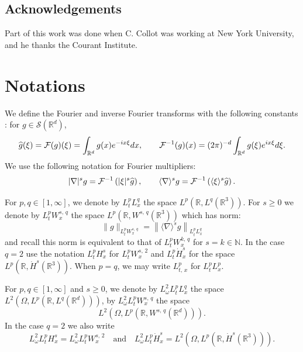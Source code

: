 \documentclass[AHL, Unicode, longabstracts,published]{cedram}
\newcommand{\R}{\mathbb{R}}
\newcommand{\N}{\mathbb{N}}
\newcommand{\mclS}{\mathcal{S}}
\newcommand{\mclF}{\mathcal{F}}
\let\oldhat\hat
\renewcommand*{\hat}[1]{\mathchoice{\widehat{#1}}{\widehat{#1}}{\oldhat{#1}}{\oldhat{#1}}}
\begin{document}
\subsection*{Acknowledgements}
Part of this work was done when C. Collot was working at New York University, and he thanks the Courant Institute.


\section{Notations}\label{sec:notations}


\begin{nota}
We define the Fourier and inverse Fourier transforms with the following constants : for $g \in \mclS(\R^d)$,
\[
\hat g (\xi) = \mclF (g) (\xi) = \int_{\R^d} g(x) e^{-ix\xi}dx, \qquad \mclF^{-1} (g) (x) = (2\pi)^{-d}\int_{\R^d} g(\xi) e^{ix\xi}d\xi.
\]
We use the following notation for Fourier multipliers:
\[
|\nabla |^s g=\mclF^{-1}\left(|\xi|^s \hat g\right),\qquad \langle \nabla \rangle^s g=\mclF^{-1}\left(\langle \xi \rangle^s \hat g\right).
\]
\end{nota}

\begin{nota}
For $p,q\in [1,\infty]$, we denote by $L^p_tL^q_x$ the space $L^p(\R,L^q(\R^3))$. For $s\geq 0$ we denote by $L^p_tW^{s,\,q}_x$ the space $ L^p(\R,W^{s,\,q}(\R^3))$ which has norm:
\[
\| g \|_{L^p_tW^{s,\,q}_x}=\left\| \langle \nabla \rangle^s g \right\|_{L^p_tL^q_x}
\]
and recall this norm is equivalent to that of $L^p_tW^{k,\,q}_x$ for $s=k\in \N$. In the case $q=2$ use the notation $L^p_tH^s_x$ for $L^p_tW^{s,\,2}_x$ and $L^p_t \dot H^s_x$ for the space $L^p(\R, \dot H^s(\R^3))$. When $p=q$, we may write $L^p_{t,\,x}$ for $L^p_tL^p_x$.
\end{nota}

\begin{nota}
For $p,q\in [1,\infty]$ and $s\geq 0$, we denote by $L^2_\omega L^p_t L^q_x$ the space $L^2(\Omega,L^p(\R,L^q(\R^d)))$, by $L^2_\omega L^p_t W^{s,\,q}_x$ the space
\[
L^2\left(\Omega,L^p\left(\R,W^{s,\,q}\left(\R^d\right)\right)\right).
\]
In the case $q=2$ we also write
\[
L^2_\omega L^p_t H^s_x=L^2_\omega L^p_tW^{s,\,2}_x\quad\text{and}\quad L^2_\omega L^p_t \dot H^s_x =L^2\left(\Omega,L^p\left(\R, \dot H^s\left(\R^3\right)\right)\right).
\]
\end{nota}
\end{document}
